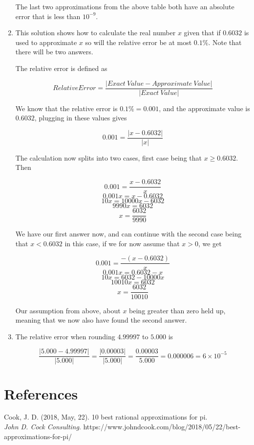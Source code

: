 \documentclass[10pt]{article}
\begin{document}
\begin{enumerate}
   The last two approximations from the above table both have an absolute error that is less than \( 10^{-9} \).

   \item This solution shows how to calculate the real number \( x \) given that if \( 0.6032 \) is used to approximate \( x \) so will the relative error be at most \( 0.1\% \). Note that there will be two answers.
   
   The relative error is defined as
   
   \[ Relative Error = \dfrac{\left| Exact \: Value - Approximate \: Value \right|}{\left| Exact \: Value\right|}\]
   
    We know that the relative error is \( 0.1\% = 0.001 \), and the approximate value is \( 0.6032 \), plugging in these values gives  
   
    \[ 0.001 = \dfrac{ \left| x - 0.6032 \right| }{ \left| x \right| } \]

    The calculation now splits into two cases, first case being that \( x \geq 0.6032 \). Then

    \[ 0.001 = \dfrac{ x - 0.6032 }{ x } \]
    \[ 0.001x =  x - 0.6032 \]
    \[ 10x =  10000x - 6032 \]
    \[ 9990x = 6032 \]
    \[ x = \dfrac{6032}{9990} \]

    We have our first answer now, and can continue with the second case being that \( x < 0.6032 \) in this case, if we for now assume that \( x > 0 \), we get

    \[ 0.001 = \dfrac{ -(x - 0.6032) }{ x } \]
    \[ 0.001x = 0.6032 - x \]
    \[ 10x =  6032 - 10000x \]
    \[ 10010x = 6032 \]
    \[ x = \dfrac{6032}{10010} \]

    Our assumption from above, about \( x \) being greater than zero held up, meaning that we now also have found the second answer.

    \item The relative error when rounding \( 4.99997 \) to \( 5.000 \) is

    \[ \dfrac{ \left| 5.000 - 4.99997 \right| }{ \left| 5.000 \right| } = 
       \dfrac{ \left| 0.00003 \right| }{ \left| 5.000 \right| } =
       \dfrac{ 0.00003 }{ 5.000 } = 0.000006 = 6 \times 10^{-5}\]

\end{enumerate}

\section{References}

Cook, J. D. (2018, May, 22). 10 best rational approximations for pi.\\
\textit{John D. Cock Consulting}. https://www.johndcook.com/blog/2018/05/22/best-approximations-for-pi/
\end{document}
